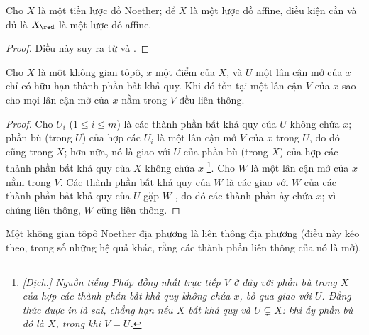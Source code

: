\documentclass[oneside]{amsart}
\renewcommand{\leq}{\leqslant}
\let\EGAOriginalLabel\label
\renewcommand{\label}[1]{\phantomsection\EGAOriginalLabel{#1}}
\begin{document}
\begin{corollary}[6.1.7]
\label{I.6.1.7}
Cho $X$ là một tiền lược đồ Noether;
để $X$ là một lược đồ affine, điều kiện cần và đủ là $X_\red$ là một lược đồ affine.
\end{corollary}

\begin{proof}
Điều này suy ra từ  và .
\end{proof}

\begin{lemma}[6.1.8]
\label{I.6.1.8}
Cho $X$ là một không gian tôpô, $x$ một điểm của $X$, và $U$ một lân cận mở
của $x$ chỉ có hữu hạn thành phần bất khả quy. Khi đó tồn tại một lân cận $V$
của $x$ sao cho mọi lân cận mở của $x$ nằm trong $V$ đều liên thông.
\end{lemma}

\begin{proof}
Cho $U_i$ ($1\leq i\leq m$) là các thành phần bất khả quy của $U$ không chứa
$x$; phần bù (trong $U$) của hợp các $U_i$ là một lân cận mở $V$ của $x$
trong $U$, do đó cũng trong $X$; hơn nữa, nó là giao với $U$ của phần bù
(trong $X$) của hợp các thành phần bất khả quy của $X$ không chứa $x$
\footnote{\emph{[Dịch.] Nguồn tiếng Pháp đồng nhất trực tiếp
$V$ ở đây với phần bù trong $X$ của hợp các thành phần bất khả quy không chứa
$x$, bỏ qua giao với $U$. Đẳng thức được in là sai, chẳng hạn nếu $X$ bất khả
quy và $U\subsetneq X$: khi ấy phần bù đó là $X$, trong khi $V=U$.}}.
Cho $W$ là một lân cận mở của $x$ nằm trong $V$. Các thành phần bất khả quy
của $W$ là các giao với $W$ của các thành phần bất khả quy của $U$ gặp $W$
, do đó các thành phần ấy chứa $x$; vì chúng liên thông, $W$
cũng liên thông.
\end{proof}

\begin{corollary}[6.1.9]
\label{I.6.1.9}
Một không gian tôpô Noether địa phương là liên thông địa phương (điều này kéo
theo, trong số những hệ quả khác, rằng các thành phần liên thông của nó là mở).
\end{corollary}
\end{document}
